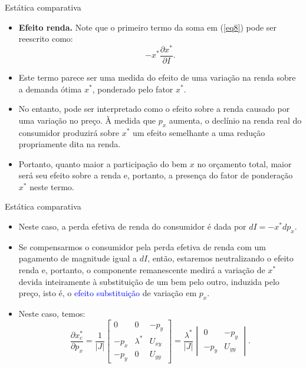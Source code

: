 \documentclass[10pt]{beamer}
\begin{document}
\begin{frame}{Estática comparativa}
\begin{itemize}
        \item \textbf{Efeito renda.} Note que o primeiro termo da soma em (\ref{eq8}) pode ser reescrito como:
        \[
        -x^* \frac{\partial x^*}{\partial I}.
        \]
        \bigskip
        \item Este termo parece ser uma medida do efeito de uma variação na renda sobre a demanda ótima $x^*$, ponderado pelo fator $x^*$.
        \bigskip
        \item No entanto, pode ser interpretado como o efeito sobre a renda causado por uma variação no preço. À medida que $p_x$ aumenta, o declínio na renda real do consumidor produzirá sobre $x^*$ um efeito semelhante a uma redução propriamente dita na renda.
        \bigskip
        \item Portanto, quanto maior a participação do bem $x$ no orçamento total, maior será seu efeito sobre a renda e, portanto, a presença do fator de ponderação $x^*$ neste termo.
\end{itemize}
\end{frame}

\begin{frame}{Estática comparativa}
\begin{itemize}
    \item Neste caso, a perda efetiva de renda do consumidor é dada por $dI = -x^*dp_x$.
    \bigskip
    \item Se compensarmos o consumidor pela perda efetiva de renda com um pagamento de magnitude igual a $dI$, então, estaremos neutralizando o efeito renda e, portanto, o componente remanescente medirá a variação de $x^*$ devida inteiramente à substituição de um bem pelo outro, induzida pelo preço, isto é, o \textcolor{blue}{efeito substituição} de variação em $p_x$.
    \bigskip
    \item Neste caso, temos:
    \begin{equation}
        \frac{\partial x_c^*}{\partial p_x} = \frac{1}{|J|}\begin{bmatrix}
            0 & 0 & -p_y \\ -p_x & \lambda^* & U_{xy} \\ -p_y & 0 & U_{yy}
        \end{bmatrix} = \frac{\lambda^*}{|J|}\begin{vmatrix}
            0 & -p_y \\ -p_y & U_{yy}
        \end{vmatrix}.
        \nonumber
    \end{equation}
\end{itemize}
\end{frame}
\end{document}
